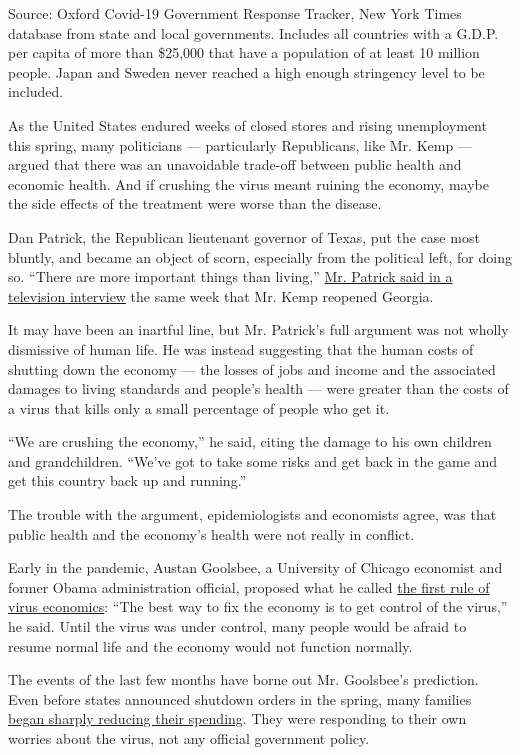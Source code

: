 Source: Oxford Covid-19 Government Response Tracker, New York Times
database from state and local governments. Includes all countries with a
G.D.P. per capita of more than \$25,000 that have a population of at
least 10 million people. Japan and Sweden never reached a high enough
stringency level to be included.

As the United States endured weeks of closed stores and rising
unemployment this spring, many politicians --- particularly Republicans,
like Mr. Kemp --- argued that there was an unavoidable trade-off between
public health and economic health. And if crushing the virus meant
ruining the economy, maybe the side effects of the treatment were worse
than the disease.

Dan Patrick, the Republican lieutenant governor of Texas, put the case
most bluntly, and became an object of scorn, especially from the
political left, for doing so. ``There are more important things than
living,''
\href{https://www.nbcnews.com/news/us-news/texas-lt-gov-dan-patrick-reopening-economy-more-important-things-n1188911}{Mr.
Patrick said in a television interview} the same week that Mr. Kemp
reopened Georgia.

It may have been an inartful line, but Mr. Patrick's full argument was
not wholly dismissive of human life. He was instead suggesting that the
human costs of shutting down the economy --- the losses of jobs and
income and the associated damages to living standards and people's
health --- were greater than the costs of a virus that kills only a
small percentage of people who get it.

``We are crushing the economy,'' he said, citing the damage to his own
children and grandchildren. ``We've got to take some risks and get back
in the game and get this country back up and running.''

The trouble with the argument, epidemiologists and economists agree, was
that public health and the economy's health were not really in conflict.

Early in the pandemic, Austan Goolsbee, a University of Chicago
economist and former Obama administration official, proposed what he
called
\href{https://twitter.com/austan_goolsbee/status/1241888950710669313?lang=en}{the
first rule of virus economics}: ``The best way to fix the economy is to
get control of the virus,'' he said. Until the virus was under control,
many people would be afraid to resume normal life and the economy would
not function normally.

The events of the last few months have borne out Mr. Goolsbee's
prediction. Even before states announced shutdown orders in the spring,
many families
\href{https://www.nytimes.com/interactive/2020/04/11/business/economy/coronavirus-us-economy-spending.html}{began
sharply reducing their spending}. They were responding to their own
worries about the virus, not any official government policy.

